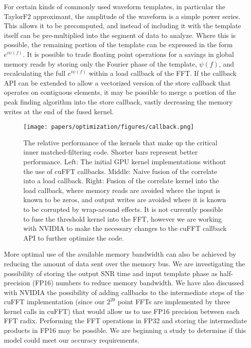 For certain kinds of commonly used waveform templates, in particular the
TaylorF2 approximant, the amplitude of the waveform is a simple power series.
This allows it to be precomputed, and instead of including it with the
template itself can be pre-multiplied into the segment of data to analyze.
Where this is possible, the remaining portion of the template can be expressed
in the form $e^{i\psi(f)}$. It is possible to trade floating point operations
for a savings in global memory reads by storing only the Fourier phase of the
template, $\psi(f)$, and recalculating the full $e^{i\psi(f)}$ within a load
callback of the FFT.  If the callback API can be extended to allow a
vectorized version of the store callback that operates on contiguous
elements, it may be possible to merge a portion of the peak finding algorithm
into the store callback, vastly decreasing the memory writes at the end of the
fused kernel.

\begin{figure}[][!t]
\centering
\texttt{[image: papers/optimization/figures/callback.png]}
\caption{\label{fig:callback} 
The relative performance of the kernels that make up the critical inner %
matched-filtering code. Shorter bars represent better performance. Left: The initial GPU kernel implementations without the
use of cuFFT callbacks. Middle: Naive fusion of the correlate into a load callback.
Right: Fusion of the correlate kernel into the load callback, where memory reads
are avoided where the input is known to be zeros, and output writes are avoided
where it is known to be corrupted by wrap-around effects. It is not currently
possible to fuse the threshold kernel into the FFT, however we are working
with NVIDIA to make the necessary changes to the cuFFT callback API to further
optimize the code.
}
\end{figure}

More optimal use of the available memory bandwidth can also be achieved by
reducing the amount of data sent over the memory bus. We are investigating the
possibility of storing the output SNR time and input template phase as
half-precision (FP16) numbers to reduce memory bandwidth. We have also
discussed with NVIDIA the possibility of adding callbacks to the intermediate
steps of the cuFFT implementation (since our $2^{20}$ point FFTs are
implemented by three kernel calls in cuFFT) that would allow us to use FP16
precision between each FFT radix. Performing the FFT operations
in FP32 and storing the intermediate products in FP16 may be possible. We are beginning
a study to determine if this model could meet our accuracy requirements.

